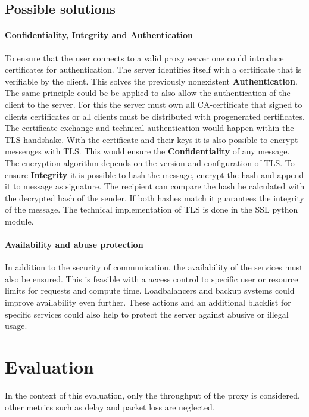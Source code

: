 \documentclass[12pt, a4paper]{scrartcl}
\begin{document}
\subsection{Possible solutions}
\paragraph{Confidentiality, Integrity and Authentication}
To ensure that the user connects to a valid proxy server one could introduce certificates for authentication. The server identifies itself with a certificate that is verifiable by the client. This solves the previously nonexistent \textbf{Authentication}. The same principle could be be applied to also allow the authentication of the client to the server. For this the server must own all CA-certificate that signed to clients certificates or all clients must be distributed with progenerated certificates.\newline
The certificate exchange and technical authentication would happen within the \ac{TLS} handshake. With the certificate and their keys it is also possible to encrypt messenges with \ac{TLS}. This would ensure the \textbf{Confidentiality} of any message. The encryption algorithm depends on the version and configuration of \ac{TLS}.\newline
To ensure \textbf{Integrity} it is possible to hash the message, encrypt the hash and append it to message as signature. The recipient can compare the hash he calculated with the decrypted hash of the sender. If both hashes match it guarantees the integrity of the message.\newline
The technical implementation of \ac{TLS} is done in the \ac{SSL} python module.
\paragraph{Availability and abuse protection}
In addition to the security of communication, the availability of the services must also be ensured. This is feasible with a access control to specific user or resource limits for requests and compute time. Loadbalancers and backup systems could improve availability even further.\newline
These actions and an additional blacklist for specific services could also help to protect the server against abusive or illegal usage.

\section{Evaluation}
In the context of this evaluation, only the throughput of the proxy is considered, other metrics such as delay and packet loss are neglected.
\end{document}
